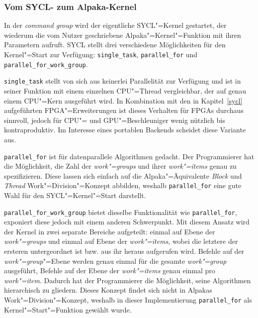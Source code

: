 \subsubsection{Vom SYCL- zum Alpaka-Kernel}
\label{implementierung:task:kernel:launch}

In der \textit{command group} wird der eigentliche SYCL"=Kernel gestartet, der
wiederum die vom Nutzer geschriebene Alpaka"=Kernel"=Funktion mit ihren
Parametern aufruft. SYCL stellt drei verschiedene Möglichkeiten für den
Kernel"=Start zur Verfügung: \texttt{single\_task}, \texttt{parallel\_for} und
\texttt{parallel\_for\_work\_group}.

\texttt{single\_task} stellt von sich aus keinerlei Parallelität zur Verfügung
und ist in seiner Funktion mit einem einzelnen CPU"=Thread vergleichbar, der auf
genau einem CPU"=Kern ausgeführt wird. In Kombination mit den in
Kapitel~\ref{sycl} aufgeführten FPGA"=Erweiterungen ist dieses Verhalten für
FPGAs durchaus sinnvoll, jedoch für CPU"= und GPU"=Beschleuniger wenig nützlich
bis kontraproduktiv. Im Interesse eines portablen Backends scheidet diese
Variante aus.

\texttt{parallel\_for} ist für datenparallele Algorithmen gedacht. Der
Programmierer hat die Möglichkeit, die Zahl der \textit{work"=groups} und ihrer
\textit{work"=items} genau zu spezifizieren. Diese lassen sich einfach auf die
Alpaka"=Äquivalente \textit{Block} und \textit{Thread} Work"=Division"=Konzept
abbilden, weshalb \texttt{parallel\_for} eine gute Wahl für den
SYCL"=Kernel"=Start darstellt.

\texttt{parallel\_for\_work\_group} bietet dieselbe Funktionalität wie
\texttt{parallel\_for}, exponiert diese jedoch mit einem anderen Schwerpunkt.
Mit diesem Ansatz wird der Kernel in zwei separate Bereiche aufgeteilt: einmal
auf Ebene der \textit{work"=groups} und einmal auf Ebene der
\textit{work"=items}, wobei die letztere der ersteren untergeordnet ist bzw.
aus ihr heraus aufgerufen wird. Befehle auf der \textit{work"=group}"=Ebene
werden genau einmal für die gesamte \textit{work"=group} ausgeführt, Befehle auf
der Ebene der \textit{work"=items} genau einmal pro \textit{work"=item}. Dadurch
hat der Programmierer die Möglichkeit, seine Algorithmen hierarchisch zu
gliedern. Dieses Konzept findet sich nicht in Alpakas Work"=Division"=Konzept,
weshalb in dieser Implementierung \texttt{parallel\_for} als
Kernel"=Start"=Funktion gewählt wurde.

